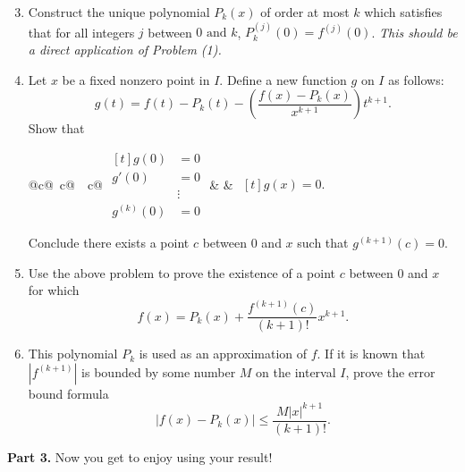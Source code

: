 \documentclass[12pt]{article}
\begin{document}
\begin{enumerate}
    \setcounter{enumi}{2}
    \item
          Construct the unique polynomial \(P_{k}(x)\) of order at most \(k\) which satisfies that for all integers \(j\) between \(0 \text{ and } k\), \(P_{k}^{(j)}(0) = f^{(j)}(0)\). \textit{This should be a direct application of Problem (1).}
    \item
          Let \(x\) be a fixed nonzero point in \(I\). Define a new function \(g\) on \(I\) as follows:
          \[
              g(t) = f(t) - P_{k}(t) - \left(\frac{f(x) - P_{k}(x)}{x^{k + 1}}\right)t^{k + 1}.
          \]
          Show that

          \begin{table}[htbp]
              \centering
              \begin{tabular}{@{}c@{\qquad\quad~}c@{\qquad\quad~~}c@{}}
                  \(\begin{aligned}[t]
                        g(0)       & = 0    \\
                        g'(0)      & = 0    \\
                                   & \vdots \\
                        g^{(k)}(0) & = 0
                    \end{aligned}\)
                   &  &
                  \(\begin{aligned}[t]
                        g(x) = 0.
                    \end{aligned}\)
              \end{tabular}
          \end{table}

          Conclude there exists a point \(c\) between 0 and \(x\) such that \(g^{(k + 1)}(c) = 0\).
    \item
          Use the above problem to prove the existence of a point \(c\) between 0 and \(x\) for which
          \[
              f(x) = P_{k}(x) + \frac{f^{(k + 1)}(c)}{(k + 1)!}x^{k + 1}.
          \]
    \item
          This polynomial \(P_{k}\) is used as an approximation of \(f\). If it is known that \(|f^{(k + 1)}|\) is bounded by some number \(M\) on the interval \(I\), prove the error bound formula
          \[
              |f(x) - P_{k}(x)| \leq \frac{M |x|^{k + 1}}{(k + 1)!}.
          \]
\end{enumerate}

\noindent\textbf{Part 3.} Now you get to enjoy using your result!
\end{document}
